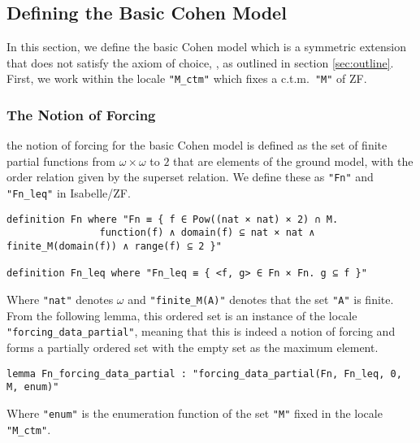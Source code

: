\documentclass{report}
\newenvironment{isaframe}{\begin{mdframed}[topline=false, rightline=false, bottomline=false]}{\end{mdframed}}
\begin{document}
\subsection{Defining the Basic Cohen Model}
In this section, we define the basic Cohen model which is a symmetric extension that does not satisfy the axiom of choice,
, as outlined in section \ref{sec:outline}.
First, we work within the locale \texttt{"M\_ctm"} which fixes a c.t.m.\  \texttt{"M"} of ZF.

\subsubsection{The Notion of Forcing}
the notion of forcing for the basic Cohen model is defined as the set of finite partial functions from $\omega \times \omega$ to $2$ that are elements of the ground model,
with the order relation given by the superset relation.
We define these as \texttt{"Fn"} and \texttt{"Fn\_leq"} in Isabelle/ZF.

\begin{isaframe}
\begin{verbatim}
definition Fn where "Fn ≡ { f ∈ Pow((nat × nat) × 2) ∩ M. 
                function(f) ∧ domain(f) ⊆ nat × nat ∧ finite_M(domain(f)) ∧ range(f) ⊆ 2 }"

definition Fn_leq where "Fn_leq ≡ { <f, g> ∈ Fn × Fn. g ⊆ f }" 
\end{verbatim}
\end{isaframe}
Where \texttt{"nat"} denotes $\omega$ and \texttt{"finite\_M(A)"} denotes that the set \texttt{"A"} is finite.
From the following lemma, this ordered set is an instance of the locale \texttt{"forcing\_data\_partial"}, 
meaning that this is indeed a notion of forcing and forms a partially ordered set with the empty set as the maximum element.
\begin{isaframe}
\begin{verbatim}
lemma Fn_forcing_data_partial : "forcing_data_partial(Fn, Fn_leq, 0, M, enum)" 
\end{verbatim}
\end{isaframe}
Where \texttt{"enum"} is the enumeration function of the set \texttt{"M"} fixed in the locale \texttt{"M\_ctm"}.
\end{document}
